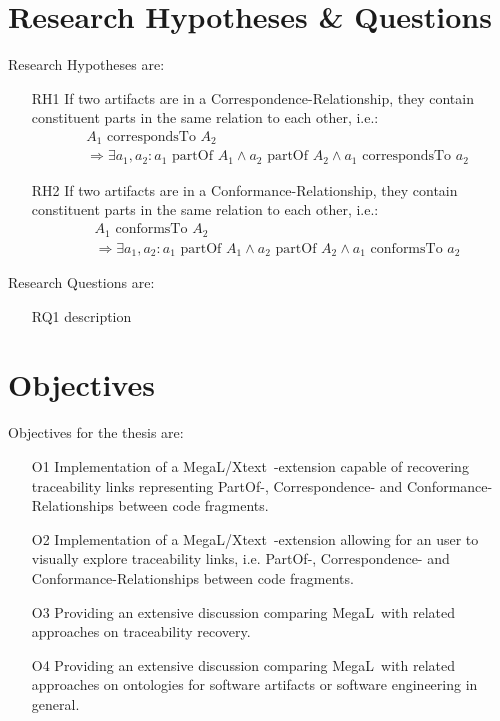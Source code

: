\documentclass[runningheads,a4paper]{llncs}
\newcommand{\partOf}{\text{~partOf~}}
\newcommand{\correspondsTo}{\text{~correspondsTo~}}
\newcommand{\conformsTo}{\text{~conformsTo~}}
\newcommand{\megal}{\textsf{MegaL}~}
\newcommand{\megalxtext}{\textsf{MegaL/Xtext}~}
\begin{document}
\section{Research Hypotheses \& Questions}
\label{section:ResearchHypthesisAndQuestions}
Research Hypotheses are:
\begin{itemize}
\item[RH1]
If two artifacts are in a Correspondence-Relationship, they contain constituent parts in the same relation to each other, i.e.:
\begin{align*}
&A_1 \correspondsTo A_2
\\&\Rightarrow
\exists a_1, a_2: 
a_1 \partOf A_1 
\wedge a_2 \partOf A_2 
\wedge a_1 \correspondsTo a_2
\end{align*}

\item[RH2]
If two artifacts are in a Conformance-Relationship, they contain constituent parts in the same relation to each other, i.e.:
\begin{align*}
&A_1 \conformsTo A_2
\\&\Rightarrow
\exists a_1, a_2: 
a_1 \partOf A_1 
\wedge a_2 \partOf A_2 
\wedge a_1 \conformsTo a_2
\end{align*}
\end{itemize}

Research Questions are:
\begin{itemize}
\item[RQ1] description
\end{itemize}

\section{Objectives}
\label{section:Objectives}
Objectives for the thesis are:
\begin{itemize}
\item[O1]
Implementation of a \megalxtext-extension capable of recovering traceability links representing PartOf-, Correspondence- and Conformance-Relationships between code fragments.
\item[O2]
Implementation of a \megalxtext-extension allowing for an user to visually explore traceability links, i.e. PartOf-, Correspondence- and Conformance-Relationships between code fragments.
\item[O3]
Providing an extensive discussion comparing \megal with related approaches on traceability recovery.
\item[O4]
Providing an extensive discussion comparing \megal with related approaches on ontologies for software artifacts or software engineering in general.
\end{itemize}
\end{document}
